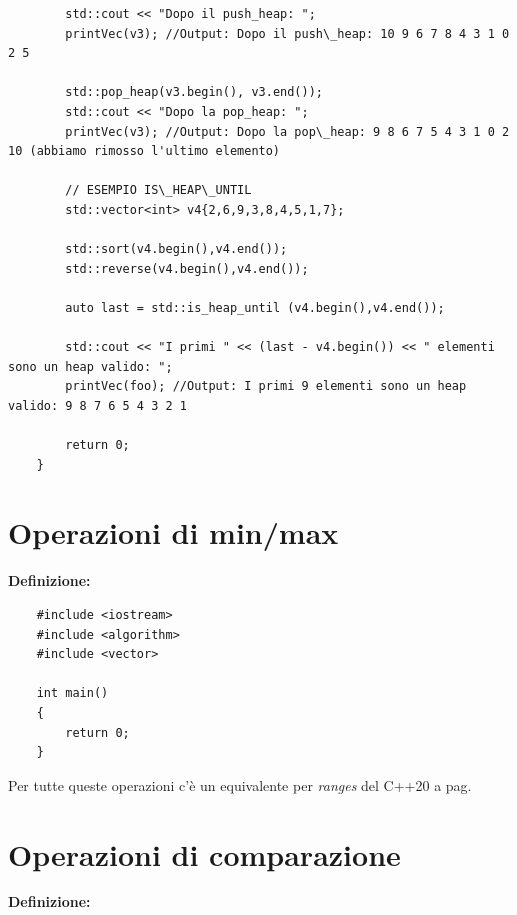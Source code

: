 \begin{lstlisting}
		std::cout << "Dopo il push_heap: ";
		printVec(v3); //Output: Dopo il push\_heap: 10 9 6 7 8 4 3 1 0 2 5
		
		std::pop_heap(v3.begin(), v3.end());
		std::cout << "Dopo la pop_heap: ";
		printVec(v3); //Output: Dopo la pop\_heap: 9 8 6 7 5 4 3 1 0 2 10 (abbiamo rimosso l'ultimo elemento)
		
		// ESEMPIO IS\_HEAP\_UNTIL
		std::vector<int> v4{2,6,9,3,8,4,5,1,7};
		
		std::sort(v4.begin(),v4.end());
		std::reverse(v4.begin(),v4.end());
		
		auto last = std::is_heap_until (v4.begin(),v4.end());
		
		std::cout << "I primi " << (last - v4.begin()) << " elementi sono un heap valido: ";
		printVec(foo); //Output: I primi 9 elementi sono un heap valido: 9 8 7 6 5 4 3 2 1
		
		return 0;
	}
\end{lstlisting}


\newpage

\section{Operazioni di min/max}

\textsf{\small \textbf{Definizione: } } \\

\begin{lstlisting}
	#include <iostream>
	#include <algorithm>
	#include <vector>
	
	int main()
	{
		return 0;
	}
\end{lstlisting}

\fleuron

\textsf{\small Per tutte queste operazioni c'è un equivalente per \emph{ranges} del C++20 a pag. \pageref{ranges}} \\


\newpage

\section{Operazioni di comparazione}

\textsf{\small \textbf{Definizione: } } \\

